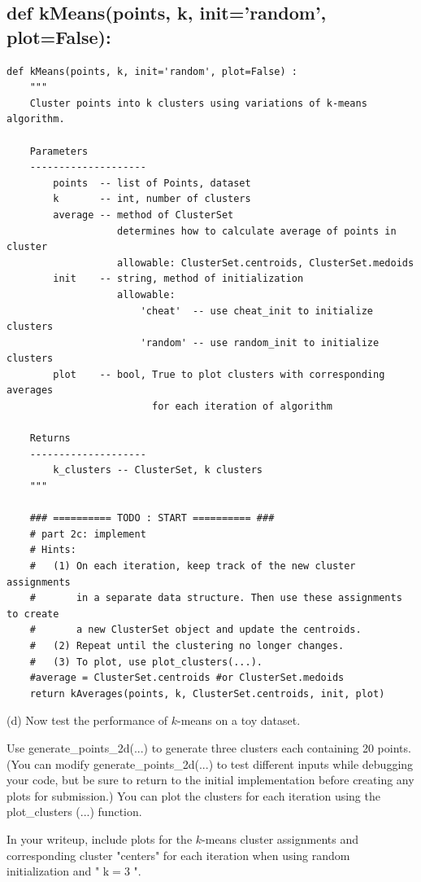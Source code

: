 \documentclass[10pt]{article}
\begin{document}
\subsection*{def kMeans(points, k, init='random', plot=False):}
\begin{verbatim}
def kMeans(points, k, init='random', plot=False) :
    """
    Cluster points into k clusters using variations of k-means algorithm.

    Parameters
    --------------------
        points  -- list of Points, dataset
        k       -- int, number of clusters
        average -- method of ClusterSet
                   determines how to calculate average of points in cluster
                   allowable: ClusterSet.centroids, ClusterSet.medoids
        init    -- string, method of initialization
                   allowable:
                       'cheat'  -- use cheat_init to initialize clusters
                       'random' -- use random_init to initialize clusters
        plot    -- bool, True to plot clusters with corresponding averages
                         for each iteration of algorithm

    Returns
    --------------------
        k_clusters -- ClusterSet, k clusters
    """

    ### ========== TODO : START ========== ###
    # part 2c: implement
    # Hints:
    #   (1) On each iteration, keep track of the new cluster assignments
    #       in a separate data structure. Then use these assignments to create
    #       a new ClusterSet object and update the centroids.
    #   (2) Repeat until the clustering no longer changes.
    #   (3) To plot, use plot_clusters(...).
    #average = ClusterSet.centroids #or ClusterSet.medoids
    return kAverages(points, k, ClusterSet.centroids, init, plot)
\end{verbatim}

(d) Now test the performance of $k$-means on a toy dataset.

Use generate\_points\_2d(...) to generate three clusters each containing 20 points. (You can modify generate\_points\_2d(...) to test different inputs while debugging your code, but be sure to return to the initial implementation before creating any plots for submission.) You can plot the clusters for each iteration using the plot\_clusters (...) function.

In your writeup, include plots for the $k$-means cluster assignments and corresponding cluster "centers" for each iteration when using random initialization and " $\mathrm{k}=3$ ".
\end{document}
